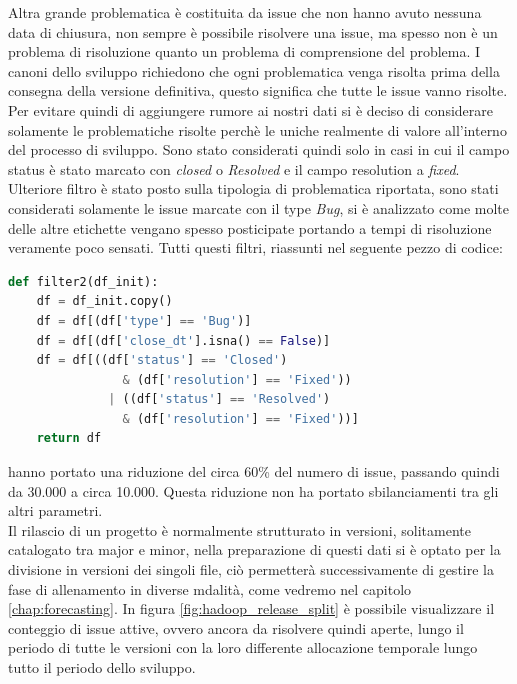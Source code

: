 \documentclass[%
    corpo=12pt,
    twoside,
    oldstyle,
    autoretitolo,
    greek,
    evenboxes,
]{toptesi}
\begin{document}
Altra grande problematica è costituita da issue che non hanno avuto nessuna data di chiusura, non sempre è possibile risolvere una issue, ma spesso non è un problema di risoluzione quanto un problema di comprensione del problema. I canoni dello sviluppo richiedono che ogni problematica venga risolta prima della consegna della versione definitiva, questo significa che tutte le issue vanno risolte. Per evitare quindi di aggiungere rumore ai nostri dati si è deciso di considerare solamente le problematiche risolte perchè le uniche realmente di valore all'interno del processo di sviluppo. Sono stato considerati quindi solo in casi in cui il campo status è stato marcato con \textit{closed} o \textit{Resolved} e il campo resolution a \textit{fixed}.
Ulteriore filtro è stato posto sulla tipologia di problematica riportata, sono stati considerati solamente le issue marcate con il type \textit{Bug}, si è analizzato come molte delle altre etichette vengano spesso posticipate portando a tempi di risoluzione veramente poco sensati. Tutti questi filtri, riassunti nel seguente pezzo di codice:
\begin{lstlisting}[language=Python, frame=single]
  def filter2(df_init):
    df = df_init.copy()
    df = df[(df['type'] == 'Bug')]
    df = df[(df['close_dt'].isna() == False)]
    df = df[((df['status'] == 'Closed') 
                & (df['resolution'] == 'Fixed')) 
              | ((df['status'] == 'Resolved') 
                & (df['resolution'] == 'Fixed'))]
    return df
\end{lstlisting}
hanno portato una riduzione del circa 60\% del numero di issue, passando quindi da 30.000 a circa 10.000. Questa riduzione non ha portato sbilanciamenti tra gli altri parametri.\\
Il rilascio di un progetto è normalmente strutturato in versioni, solitamente catalogato tra major e minor, nella preparazione di questi dati si è optato per la divisione in versioni dei singoli file, ciò permetterà successivamente di gestire la fase di allenamento in diverse mdalità, come vedremo nel capitolo \ref{chap:forecasting}. In figura \ref{fig:hadoop_release_split} è possibile visualizzare il conteggio di issue attive, ovvero ancora da risolvere quindi aperte, lungo il periodo di tutte le versioni con la loro differente allocazione temporale lungo tutto il periodo dello sviluppo.\\
\end{document}

